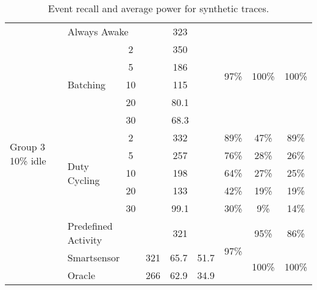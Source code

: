 \begin{table*}
{\begin{tabular}{|l|l|c|c|c|c|c|c|c|}
	\multirow{14}{*}{\parbox{1.2cm}{Group 3 10\% idle}}	& \multicolumn{2}{l|}{Always Awake}						& \multicolumn{3}{c|}{323}				& \multirow{6}{*}{97\%}	& \multirow{6}{*}{100\%}	& \multirow{6}{*}{100\%}	\\ \cline{2-6}
								& \multirow{5}{*}{Batching}		& 2						& \multicolumn{3}{c|}{350}				&						&							&							\\ \cline{3-6}
								& 								& 5						& \multicolumn{3}{c|}{186}				&						&							&							\\ \cline{3-6}
								& 								& 10					& \multicolumn{3}{c|}{115}				&						&							&							\\ \cline{3-6}
								& 								& 20					& \multicolumn{3}{c|}{80.1}				&						&							&							\\ \cline{3-6}
								& 								& 30					& \multicolumn{3}{c|}{68.3}				&						&							&							\\ \cline{2-9}
								& \multirow{5}{*}{Duty Cycling}	& 2						& \multicolumn{3}{c|}{332}				& 89\%					& 47\%						& 89\%						\\ \cline{3-9}
								& 								& 5						& \multicolumn{3}{c|}{257}				& 76\%					& 28\%						& 26\%						\\ \cline{3-9}
								& 								& 10					& \multicolumn{3}{c|}{198}				& 64\%					& 27\%						& 25\%						\\ \cline{3-9}
								& 								& 20					& \multicolumn{3}{c|}{133}				& 42\%					& 19\%						& 19\%						\\ \cline{3-9}
								& 								& 30					& \multicolumn{3}{c|}{99.1}				& 30\%					& 9\%						& 14\%						\\ \cline{2-9}
								& \multicolumn{2}{l|}{Predefined Activity}				& \multicolumn{3}{c|}{321}				& \multirow{3}{*}{97\%}	& 95\%						& 86\%						\\ \cline{2-6}\cline{8-9}
								& \multicolumn{2}{l|}{Smartsensor}						& 321		& 65.7		& 51.7			& 						& \multirow{2}{*}{100\%}	& \multirow{2}{*}{100\%}	\\ \cline{2-6}
								& \multicolumn{2}{l|}{Oracle}							& 266		& 62.9		& 34.9			& 						& 							& 							\\ \hline
    \end{tabular}
}
	\caption{Event recall and average power for synthetic traces.}
	\label{table:summaryRecallPower}
\end{table*}